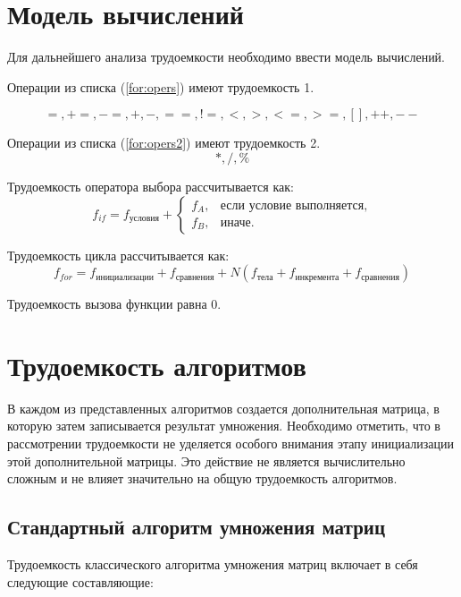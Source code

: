 \section{Модель вычислений}
Для дальнейшего анализа трудоемкости необходимо ввести модель вычислений.

Операции из списка (\ref{for:opers}) имеют трудоемкость 1.

\begin{equation}
	\label{for:opers}
	=, +=, -=, +, -, ==, !=, <, >, <=, >=, [], ++, {-}-
\end{equation}

Операции из списка (\ref{for:opers2}) имеют трудоемкость 2.
\begin{equation}
	\label{for:opers2}
	*, /, \%
\end{equation}

Трудоемкость оператора выбора  рассчитывается как:
\begin{equation}
	\label{for:if}
	f_{if} = f_{\text{условия}} +
	\begin{cases}
		f_A, & \text{если условие выполняется,}\\
		f_B, & \text{иначе.}
	\end{cases}
\end{equation}

Трудоемкость цикла рассчитывается как:
\begin{equation}
	\label{for:for}
	f_{for} = f_{\text{инициализации}} + f_{\text{сравнения}} + N(f_{\text{тела}} + f_{\text{инкремента}} + f_{\text{сравнения}})
\end{equation}

Трудоемкость вызова функции равна 0.

\section{Трудоемкость алгоритмов}
В каждом из представленных алгоритмов создается дополнительная матрица, в которую затем записывается результат умножения. 
Необходимо отметить, что в рассмотрении трудоемкости не уделяется особого внимания этапу инициализации этой дополнительной матрицы. 
Это действие не является вычислительно сложным и не влияет значительно на общую трудоемкость алгоритмов.

\subsection{Стандартный алгоритм умножения матриц}
Трудоемкость классического алгоритма умножения матриц включает в себя следующие составляющие:

